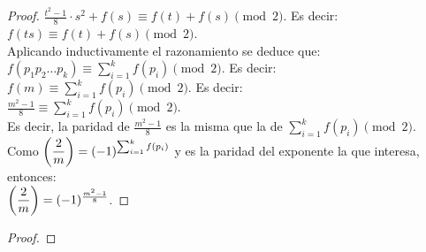 \begin{proof}
$\frac{t^2 - 1}{8}\cdot s^2 + f(s)\equiv f(t)+f(s) \pmod{2}$. Es decir: \\
$f(ts) \equiv f(t) + f(s) \pmod{2}$. \\
Aplicando inductivamente el razonamiento se deduce que: \\
$f(p_1 p_2 \dots p_k) \equiv \sum_{i=1}^k f(p_i) \pmod{2}$. Es decir: \\
$f(m) \equiv \sum_{i=1}^k f(p_i) \pmod{2}$. Es decir:\\
$\frac{m^2-1}{8} \equiv \sum_{i=1}^k f(p_i) \pmod{2}$. \\
Es decir, la paridad de $\frac{m^2-1}{8}$ es la misma que la de $\sum_{i=1}^k f(p_i) \pmod{2}$. \\
Como $\left(\dfrac{2}{m}\right) = (-1)^{\sum_{i=1}^k f(p_i)}$ y es la paridad del exponente la que interesa, entonces: \\
$\left(\dfrac{2}{m}\right) = (-1)^{\frac{m^2-1}{8}}$.
\end{proof}


\begin{proof}

\end{proof}